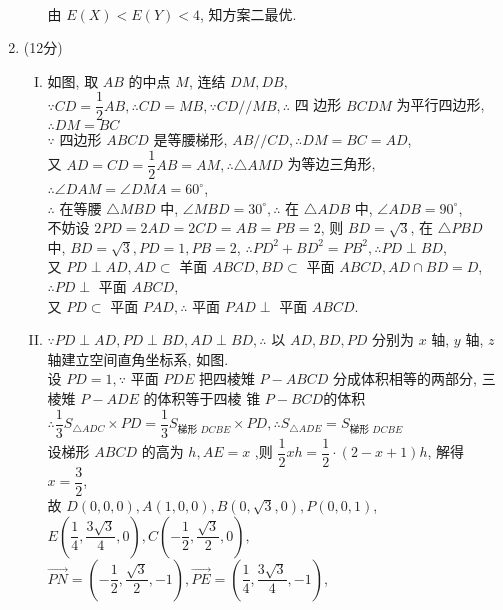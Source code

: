 \documentclass[11pt]{article}
\begin{document}
\begin{enumerate}
\begin{enumerate}[(I)]
		\\由 $E(X)<E(Y)<4$, 知方案二最优.
	\end{enumerate}
	\item (12分)
	\begin{enumerate}[(I)]
		\item 如图, 取 $A B$ 的中点 $M$, 连结 $D M, D B,$
		\\$ \because C D=\dfrac{1}{2} A B, \therefore C D=M B, \because C D / / M B, \therefore$ 四 边形 $B C D M$ 为平行四边形, $\therefore D M=B C$
		\\$ \because$ 四边形 $A B C D$ 是等腰梯形, $A B / / C D, \therefore D M=B C=A D$, 
		\\又 $A D=C D=\dfrac{1}{2} A B=A M, \therefore \triangle A M D$ 为等边三角形, $\therefore \angle D A M=\angle D M A=60^{\circ}$,
		\\$\therefore$ 在等腰 $\triangle M B D$ 中, $\angle M B D=30^{\circ}, \therefore$ 在 $\triangle A D B$ 中, $\angle A D B=90^{\circ}$, \\不妨设
		$2 P D=2 A D=2 C D=A B=P B=2$, 则 $B D=\sqrt{3}$, 在 $\triangle P B D$ 中, $B D=\sqrt{3}, P D=1, P B=2$,
		$\therefore P D^{2}+B D^{2}=P B^{2}, \therefore P D \perp B D$,
		\\又 $P D \perp A D, A D \subset$ 羊面 $A B C D, B D \subset$ 平面 $A B C D, A D \cap B D=D$,
		$\therefore P D \perp$ 平面 $A B C D$, 
		\\又 $P D \subset$ 平面 $P A D, \therefore$ 平面 $P A D \perp$ 平面 $A B C D$.
		\item $\because P D \perp A D, P D \perp B D, A D \perp B D, \therefore$ 以 $A D, B D, P D$ 分别为 $x$ 轴, $y$ 轴, $z$ 轴建立空间直角坐标系, 如图.
		\\设 $P D=1, \because$ 平面 $P D E$ 把四棱雉 $P-A B C D$ 分成体积相等的两部分, 三棱雉 $P-A D E$ 的体积等于四棱 锥 $P-B C D $的体积
		\\$\therefore \dfrac{1}{3} S_{\triangle A D C} \times P D=\dfrac{1}{3} S_{\text {梯形 } D C B E} \times P D , \therefore S_{\triangle A D E}=S_{\text {梯形 } D C B E}$
		\\设梯形 $A B C D$ 的高为 $h, A E=x$ ,则 $\dfrac{1}{2} x h=\dfrac{1}{2} \cdot (2-x+1) h$, 解得 $x=\dfrac{3}{2}$, 
		\\故 $D(0,0,0), A(1,0,0), B(0, \sqrt{3}, 0), P(0,0,1)$,$E\left(\dfrac{1}{4}, \dfrac{3 \sqrt{3}}{4}, 0\right), C\left(-\dfrac{1}{2}, \dfrac{\sqrt{3}}{2}, 0\right) ,$
		\\$\overrightarrow{P N}=\left(-\dfrac{1}{2}, \dfrac{\sqrt{3}}{2},-1\right), \overrightarrow{P E}=\left(\dfrac{1}{4}, \dfrac{3 \sqrt{3}}{4},-1\right)$,

\end{enumerate}
\end{enumerate}
\end{document}
